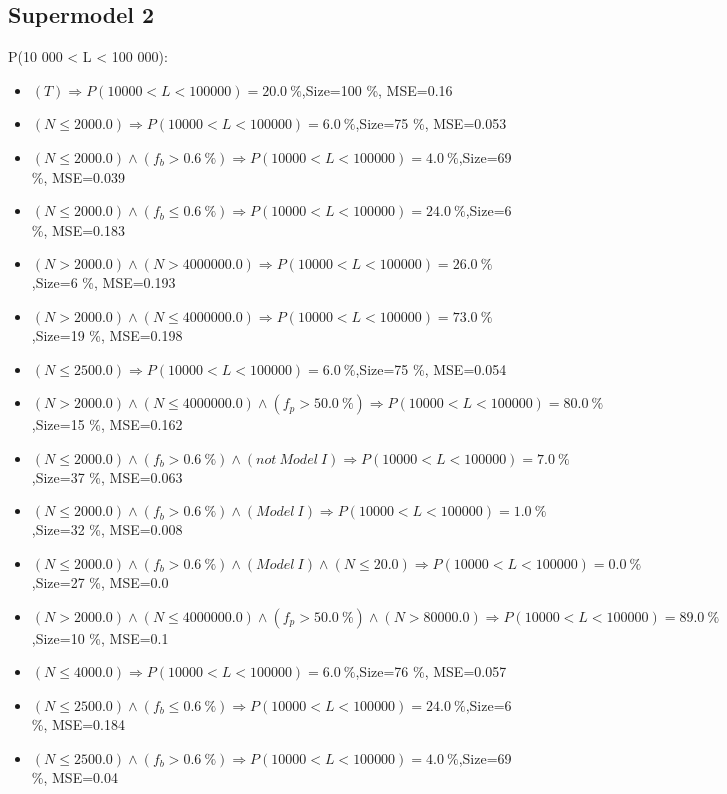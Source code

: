 \documentclass[numbered]{CSL}
\begin{document}
\subsection{Supermodel 2}
P(10 000 < L < 100 000):
\begin{itemize}
\item $(T) \Rightarrow P(10 000 < L < 100 000) = 20.0~\%$,\hfill Size=100 \%, MSE=0.16
\item $(N \leq 2000.0) \Rightarrow P(10 000 < L < 100 000) = 6.0~\%$,\hfill Size=75 \%, MSE=0.053
\item $(N \leq 2000.0) \land (f_b > 0.6~\%) \Rightarrow P(10 000 < L < 100 000) = 4.0~\%$,\hfill Size=69 \%, MSE=0.039
\item $(N \leq 2000.0) \land (f_b \leq 0.6~\%) \Rightarrow P(10 000 < L < 100 000) = 24.0~\%$,\hfill Size=6 \%, MSE=0.183
\item $(N > 2000.0) \land (N > 4000000.0) \Rightarrow P(10 000 < L < 100 000) = 26.0~\%$,\hfill Size=6 \%, MSE=0.193
\item $(N > 2000.0) \land (N \leq 4000000.0) \Rightarrow P(10 000 < L < 100 000) = 73.0~\%$,\hfill Size=19 \%, MSE=0.198
\item $(N \leq 2500.0) \Rightarrow P(10 000 < L < 100 000) = 6.0~\%$,\hfill Size=75 \%, MSE=0.054
\item $(N > 2000.0) \land (N \leq 4000000.0) \land (f_p > 50.0~\%) \Rightarrow P(10 000 < L < 100 000) = 80.0~\%$,\hfill Size=15 \%, MSE=0.162
\item $(N \leq 2000.0) \land (f_b > 0.6~\%) \land (not~Model~I) \Rightarrow P(10 000 < L < 100 000) = 7.0~\%$,\hfill Size=37 \%, MSE=0.063
\item $(N \leq 2000.0) \land (f_b > 0.6~\%) \land (Model~I) \Rightarrow P(10 000 < L < 100 000) = 1.0~\%$,\hfill Size=32 \%, MSE=0.008
\item $(N \leq 2000.0) \land (f_b > 0.6~\%) \land (Model~I) \land (N \leq 20.0) \Rightarrow P(10 000 < L < 100 000) = 0.0~\%$,\hfill Size=27 \%, MSE=0.0
\item $(N > 2000.0) \land (N \leq 4000000.0) \land (f_p > 50.0~\%) \land (N > 80000.0) \Rightarrow P(10 000 < L < 100 000) = 89.0~\%$,\hfill Size=10 \%, MSE=0.1
\item $(N \leq 4000.0) \Rightarrow P(10 000 < L < 100 000) = 6.0~\%$,\hfill Size=76 \%, MSE=0.057
\item $(N \leq 2500.0) \land (f_b \leq 0.6~\%) \Rightarrow P(10 000 < L < 100 000) = 24.0~\%$,\hfill Size=6 \%, MSE=0.184
\item $(N \leq 2500.0) \land (f_b > 0.6~\%) \Rightarrow P(10 000 < L < 100 000) = 4.0~\%$,\hfill Size=69 \%, MSE=0.04

\end{itemize}
\end{document}
